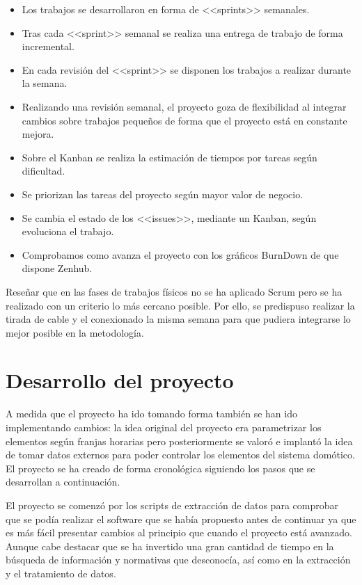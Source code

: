 \begin{itemize}
    \item Los trabajos se desarrollaron en forma de <<sprints>> semanales.
    \item Tras cada <<sprint>> semanal se realiza una entrega de trabajo de forma incremental.
    \item En cada revisión del <<sprint>> se disponen los trabajos a realizar durante la semana.
    \item Realizando una revisión semanal, el proyecto goza de flexibilidad al integrar cambios sobre trabajos pequeños de forma que el proyecto está en constante mejora.
    \item Sobre el Kanban se realiza la estimación de tiempos por tareas según dificultad.
    \item Se priorizan las tareas del proyecto según mayor valor de negocio.
    \item Se cambia el estado de los <<issues>>, mediante un Kanban, según evoluciona el trabajo.
    \item Comprobamos como avanza el proyecto con los gráficos BurnDown de que dispone Zenhub.
\end{itemize}

Reseñar que en las fases de trabajos físicos no se ha aplicado Scrum pero se ha realizado con un criterio lo más cercano posible. Por ello, se predispuso realizar la tirada de cable y el conexionado la misma semana para que pudiera integrarse lo mejor posible en la metodología.

\section{Desarrollo del proyecto}
A medida que el proyecto ha ido tomando forma también se han ido implementando cambios: la idea original del proyecto era parametrizar los elementos según franjas horarias pero posteriormente se valoró e implantó la idea de tomar datos externos para poder controlar los elementos del sistema domótico. El proyecto se ha creado de forma cronológica siguiendo los pasos que se desarrollan a continuación.

El proyecto se comenzó por los scripts de extracción de datos para comprobar que se podía realizar el software que se había propuesto antes de continuar ya que es más fácil presentar cambios al principio que cuando el proyecto está avanzado. Aunque cabe destacar que se ha invertido una gran cantidad de tiempo en la búsqueda de información y normativas que desconocía, así como en la extracción y el tratamiento de datos.

